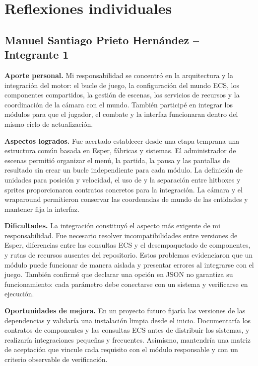 \documentclass[12pt,letterpaper]{report}
\newcommand{\archivo}[1]{\texttt{\detokenize{#1}}}
\begin{document}
\section{Reflexiones individuales}

\subsection*{Manuel Santiago Prieto Hernández -- Integrante 1}
\textbf{Aporte personal.} Mi responsabilidad se concentró en la arquitectura y la integración del motor: el bucle de juego, la configuración del mundo ECS, los componentes compartidos, la gestión de escenas, los servicios de recursos y la coordinación de la cámara con el mundo. También participé en integrar los módulos para que el jugador, el combate y la interfaz funcionaran dentro del mismo ciclo de actualización.

\textbf{Aspectos logrados.} Fue acertado establecer desde una etapa temprana una estructura común basada en Esper, fábricas y sistemas. El administrador de escenas permitió organizar el menú, la partida, la pausa y las pantallas de resultado sin crear un bucle independiente para cada módulo. La definición de unidades para posición y velocidad, el uso de \archivo{delta_time} y la separación entre hitboxes y sprites proporcionaron contratos concretos para la integración. La cámara y el wraparound permitieron conservar las coordenadas de mundo de las entidades y mantener fija la interfaz.

\textbf{Dificultades.} La integración constituyó el aspecto más exigente de mi responsabilidad. Fue necesario resolver incompatibilidades entre versiones de Esper, diferencias entre las consultas ECS y el desempaquetado de componentes, y rutas de recursos ausentes del repositorio. Estos problemas evidenciaron que un módulo puede funcionar de manera aislada y presentar errores al integrarse con el juego. También confirmé que declarar una opción en JSON no garantiza su funcionamiento: cada parámetro debe conectarse con un sistema y verificarse en ejecución.

\textbf{Oportunidades de mejora.} En un proyecto futuro fijaría las versiones de las dependencias y validaría una instalación limpia desde el inicio. Documentaría los contratos de componentes y las consultas ECS antes de distribuir los sistemas, y realizaría integraciones pequeñas y frecuentes. Asimismo, mantendría una matriz de aceptación que vincule cada requisito con el módulo responsable y con un criterio observable de verificación.
\end{document}
